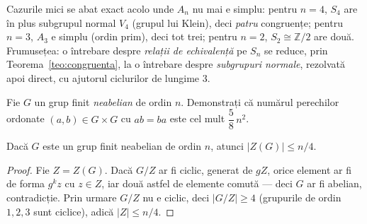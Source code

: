 \begin{obs}
Cazurile mici se abat exact acolo unde $A_{n}$ nu mai e simplu: pentru
$n=4$, $S_{4}$ are în plus subgrupul normal $V_{4}$ (grupul lui Klein),
deci \emph{patru} congruențe; pentru $n=3$, $A_{3}$ e simplu (ordin
prim), deci tot trei; pentru $n=2$, $S_{2}\cong\mathbb{Z}/2$ are două.
Frumusețea: o întrebare despre \emph{relații de echivalență}
pe $S_{n}$ se reduce, prin Teorema~\ref{teo:congruenta}, la o întrebare despre
\emph{subgrupuri normale}, rezolvată apoi direct, cu ajutorul ciclurilor de lungime $3$.
\end{obs}

\begin{problema}[Clasică]
Fie $G$ un grup finit \emph{neabelian} de ordin $n$. Demonstrați că
numărul perechilor ordonate $(a,b)\in G\times G$ cu $ab=ba$ este cel mult
$\dfrac{5}{8}\,n^{2}$.
\end{problema}

\begin{lemat}
Dacă $G$ este un grup finit neabelian de ordin $n$, atunci
$|Z(G)|\le n/4$.
\end{lemat}

\begin{proof}
Fie $Z=Z(G)$. Dacă $G/Z$ ar fi ciclic, generat de $gZ$, orice element ar
fi de forma $g^{k}z$ cu $z\in Z$, iar două astfel de elemente comută
--- deci $G$ ar fi abelian, contradicție. Prin urmare $G/Z$ nu e ciclic,
deci $|G/Z|\ge 4$ (grupurile de ordin $1,2,3$ sunt ciclice), adică
$|Z|\le n/4$.
\end{proof}

